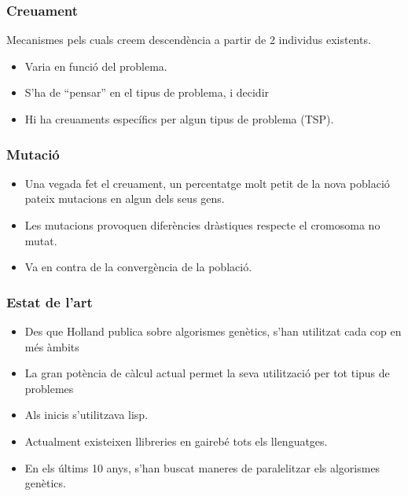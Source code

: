 \documentclass{beamer}
\begin{document}

\begin{frame}
	\frametitle{Creuament}
	\begin{block}
		Mecanismes pels cuals creem descendència a partir de 2 individus
		existents.
	\end{block}
		\begin{itemize}
			\item Varia en funció del problema. %
			\item S'ha de ``pensar'' en el tipus de problema, i decidir
			\item Hi ha creuaments específics per algun tipus de problema (TSP).
		\end{itemize}
\end{frame}


\begin{frame}
	\frametitle{Mutació}
		\begin{itemize}
			\item Una vegada fet el creuament, un percentatge molt petit de la nova
			població pateix mutacions en algun dels seus gens.
			\item Les mutacions provoquen diferències dràstiques respecte el
			cromosoma no mutat.
			\item Va en contra de la convergència de la població.
		\end{itemize}
\end{frame}


\begin{frame}
\frametitle{Estat de l'art}
\begin{itemize}
\item Des que Holland publica sobre algorismes genètics, s'han utilitzat cada
cop en més àmbits
\item La gran potència de càlcul actual permet la seva utilització per tot tipus
de problemes
\pause
\item Als inicis s'utilitzava lisp.
\item Actualment existeixen llibreries en gairebé tots els llenguatges.
\item En els últims 10 anys, s'han buscat maneres de paralelitzar els algorismes
genètics.
\end{itemize}
\end{frame}

\end{document}
